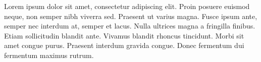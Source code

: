 \medskip

Lorem ipsum dolor sit amet, consectetur adipiscing elit. Proin posuere euismod neque, non semper nibh viverra sed. Praesent ut varius magna. Fusce ipsum ante, semper nec interdum at, semper et lacus. Nulla ultrices magna a fringilla finibus. Etiam sollicitudin blandit ante. Vivamus blandit rhoncus tincidunt. Morbi sit amet congue purus. Praesent interdum gravida congue. Donec fermentum dui fermentum maximus rutrum.






